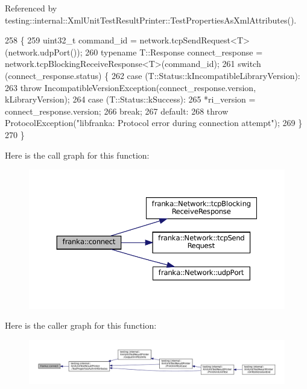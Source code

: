 Referenced by testing\+::internal\+::\+Xml\+Unit\+Test\+Result\+Printer\+::\+Test\+Properties\+As\+Xml\+Attributes().


\begin{DoxyCode}
258                                                      \{
259   uint32\_t command\_id = network.tcpSendRequest<T>(network.udpPort());
260   \textcolor{keyword}{typename} T::Response connect\_response = network.tcpBlockingReceiveResponse<T>(command\_id);
261   \textcolor{keywordflow}{switch} (connect\_response.status) \{
262     \textcolor{keywordflow}{case} (T::Status::kIncompatibleLibraryVersion):
263       \textcolor{keywordflow}{throw} IncompatibleVersionException(connect\_response.version, kLibraryVersion);
264     \textcolor{keywordflow}{case} (T::Status::kSuccess):
265       *ri\_version = connect\_response.version;
266       \textcolor{keywordflow}{break};
267     \textcolor{keywordflow}{default}:
268       \textcolor{keywordflow}{throw} ProtocolException(\textcolor{stringliteral}{"libfranka: Protocol error during connection attempt"});
269   \}
270 \}
\end{DoxyCode}
Here is the call graph for this function\+:
\nopagebreak
\begin{figure}[H]
\begin{center}
\leavevmode
\includegraphics[width=350pt]{namespacefranka_a3e41d6a4328598c51909546b0e701179_cgraph}
\end{center}
\end{figure}
Here is the caller graph for this function\+:
\nopagebreak
\begin{figure}[H]
\begin{center}
\leavevmode
\includegraphics[width=350pt]{namespacefranka_a3e41d6a4328598c51909546b0e701179_icgraph}
\end{center}
\end{figure}
\mbox{\label{namespacefranka_a0eaee201f8afdb02f6530269cb581cbb}} 

